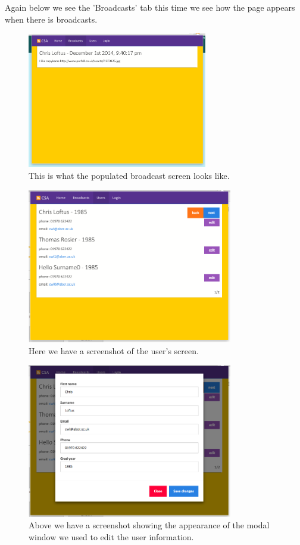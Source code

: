 \documentclass{article}
\begin{document}
Again below we see the 'Broadcasts' tab this time we see how the page appears when there is broadcasts.

\begin{figure}[H]
\centering
\includegraphics[width=0.7\textwidth]{populatebcpage}
\caption{This is what the populated broadcast screen looks like.}
\end{figure}

\begin{figure}[H]
\centering
\includegraphics[width=0.8\textwidth]{userpage}
\caption{Here we have a screenshot of the user's screen.}
\end{figure}

\begin{figure}[H]
\centering
\includegraphics[width=0.8\textwidth]{modalpage}
\caption{Above we have a screenshot showing the appearance of the modal window we used to edit the user information.}
\end{figure}
\end{document}
